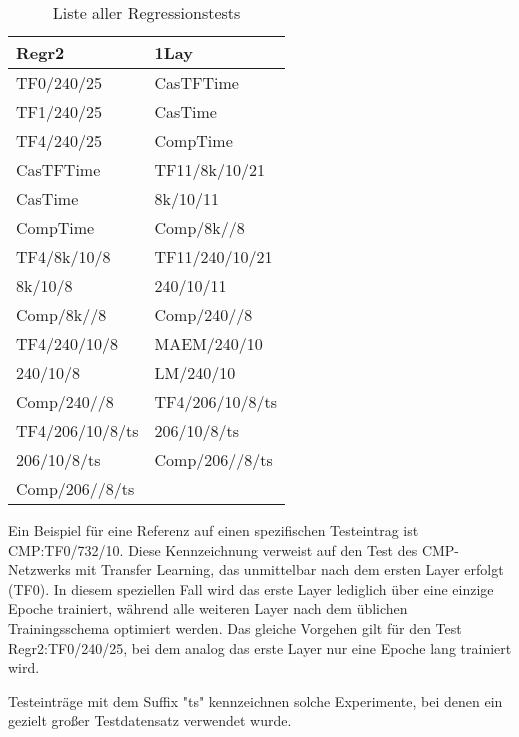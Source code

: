 \begin{table}[!ht]
    \centering
    \begin{tabular}{l|l}
        \textbf{Regr2} & \textbf{1Lay} \\
        \hline
        TF0/240/25 & CasTFTime \\
        TF1/240/25 & CasTime \\
        TF4/240/25 & CompTime \\
        CasTFTime & TF11/8k/10/21 \\
        CasTime & 8k/10/11 \\
        CompTime & Comp/8k//8 \\
        TF4/8k/10/8 & TF11/240/10/21 \\
        8k/10/8 & 240/10/11 \\
        Comp/8k//8 & Comp/240//8 \\
        TF4/240/10/8 & MAEM/240/10 \\
        240/10/8 & LM/240/10 \\
        Comp/240//8 & TF4/206/10/8/ts \\
        TF4/206/10/8/ts & 206/10/8/ts \\
        206/10/8/ts & Comp/206//8/ts \\
        Comp/206//8/ts &
    \end{tabular}
    \caption{\label{tab:regrtests} Liste aller Regressionstests}
\end{table}

Ein Beispiel für eine Referenz auf einen spezifischen Testeintrag ist CMP:TF0/732/10. Diese Kennzeichnung verweist auf den Test des 
CMP-Netzwerks mit Transfer Learning, das unmittelbar nach dem ersten Layer erfolgt (TF0). In diesem speziellen Fall wird das erste Layer 
lediglich über eine einzige Epoche trainiert, während alle weiteren Layer nach dem üblichen Trainingsschema optimiert werden. Das gleiche 
Vorgehen gilt für den Test Regr2:TF0/240/25, bei dem analog das erste Layer nur eine Epoche lang trainiert wird.

Testeinträge mit dem Suffix "ts" kennzeichnen solche Experimente, bei denen ein gezielt großer Testdatensatz verwendet wurde.
